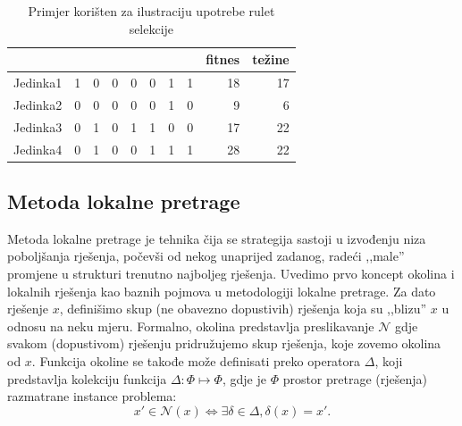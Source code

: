 \documentclass[a4paper, utf8, 11pt, colorlinks]{book}
\theoremstyle{definition}
\begin{document}
\begin{table}
	\centering
	\begin{tabular}{l|rrrrrrrrr}
		& \multicolumn{1}{l}{} & \multicolumn{1}{l}{} & \multicolumn{1}{l}{} & \multicolumn{1}{l}{} & \multicolumn{1}{l}{} & \multicolumn{1}{l}{} & \multicolumn{1}{l}{} & \multicolumn{1}{l}{fitnes} & \multicolumn{1}{l}{težine}  \\\hline
		Jedinka1 & 1                    & 0                    & 0                    & 0                    & 0                    & 1                    & 1                    & 18                         & 17                          \\
		Jedinka2 & 0                    & 0                    & 0                    & 0                    & 0                    & 1                    & 0                    & 9                          & 6                           \\
		Jedinka3 & 0                    & 1                    & 0                    & 1                    & 1                    & 0                    & 0                    & 17                         & 22                          \\
		Jedinka4 & 0                    & 1                    & 0                    & 0                    & 1                    & 1                    & 1                    & 28                         & 22      \\\hline                   
	\end{tabular}\caption{Primjer korišten za ilustraciju upotrebe rulet selekcije}
	\label{tab:rulet}
\end{table}
 
\subsection{Metoda lokalne pretrage}\label{sec: local_search}

Metoda lokalne pretrage je tehnika čija se strategija sastoji u izvođenju niza poboljšanja  rješenja, počevši od nekog unaprijed zadanog, radeći ,,male'' promjene u strukturi trenutno najboljeg rješenja. Uvedimo prvo koncept okolina i lokalnih rješenja kao baznih pojmova u metodologiji lokalne pretrage. Za dato rješenje $x$, definišimo skup (ne obavezno dopustivih) rješenja koja su ,,blizu'' $x$ u odnosu na neku mjeru. Formalno, okolina predstavlja preslikavanje  $\mathcal{N}$ gdje svakom (dopustivom) rješenju pridružujemo skup rješenja, koje zovemo okolina od $x$.  Funkcija okoline se takođe može definisati preko operatora  $\Delta$, koji predstavlja kolekciju   funkcija $\Delta:\Phi \mapsto \Phi$,  gdje je $\Phi$ prostor pretrage (rješenja) razmatrane instance problema:
$$ x' \in \mathcal{N}(x) \Longleftrightarrow \exists \delta \in \Delta,\delta(x)=x'.$$
 
\end{document}
